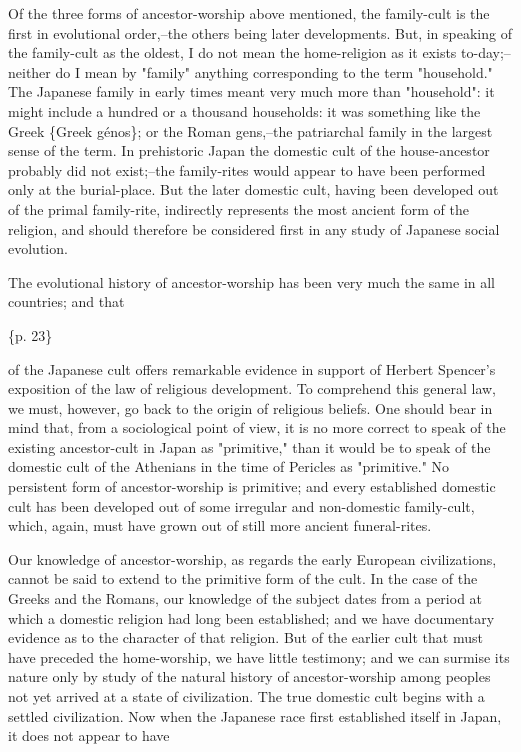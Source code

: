 Of the three forms of ancestor-worship above mentioned, the family-cult is the first in evolutional order,--the others being later developments. But, in speaking of the family-cult as the oldest, I do not mean the home-religion as it exists to-day;--neither do I mean by "family" anything corresponding to the term "household." The Japanese family in early times meant very much more than "household": it might include a hundred or a thousand households: it was something like the Greek \{Greek génos\}; or the Roman gens,--the patriarchal family in the largest sense of the term. In prehistoric Japan the domestic cult of the house-ancestor probably did not exist;--the family-rites would appear to have been performed only at the burial-place. But the later domestic cult, having been developed out of the primal family-rite, indirectly represents the most ancient form of the religion, and should therefore be considered first in any study of Japanese social evolution.

The evolutional history of ancestor-worship has been very much the same in all countries; and that

\{p. 23\}

of the Japanese cult offers remarkable evidence in support of Herbert Spencer's exposition of the law of religious development. To comprehend this general law, we must, however, go back to the origin of religious beliefs. One should bear in mind that, from a sociological point of view, it is no more correct to speak of the existing ancestor-cult in Japan as "primitive," than it would be to speak of the domestic cult of the Athenians in the time of Pericles as "primitive." No persistent form of ancestor-worship is primitive; and every established domestic cult has been developed out of some irregular and non-domestic family-cult, which, again, must have grown out of still more ancient funeral-rites.

Our knowledge of ancestor-worship, as regards the early European civilizations, cannot be said to extend to the primitive form of the cult. In the case of the Greeks and the Romans, our knowledge of the subject dates from a period at which a domestic religion had long been established; and we have documentary evidence as to the character of that religion. But of the earlier cult that must have preceded the home-worship, we have little testimony; and we can surmise its nature only by study of the natural history of ancestor-worship among peoples not yet arrived at a state of civilization. The true domestic cult begins with a settled civilization. Now when the Japanese race first established itself in Japan, it does not appear to have

